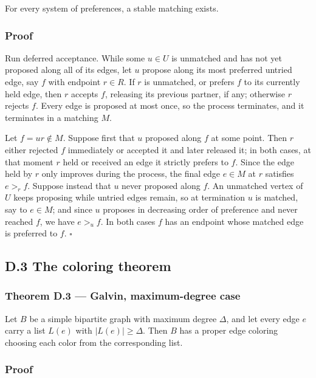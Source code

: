\documentclass[
  american,
  11pt,
  a4paper,
]{article}
\begin{document}
For every system of preferences, a stable matching exists.

\subsubsection{Proof}\label{proof-10}

Run deferred acceptance. While some \(u\in U\) is unmatched and has not yet proposed along all of its edges, let \(u\) propose along its most preferred untried edge, say \(f\) with endpoint \(r\in R\). If \(r\) is unmatched, or prefers \(f\) to its currently held edge, then \(r\) accepts \(f\), releasing its previous partner, if any; otherwise \(r\) rejects \(f\). Every edge is proposed at most once, so the process terminates, and it terminates in a matching \(M\).

Let \(f=ur\notin M\). Suppose first that \(u\) proposed along \(f\) at some point. Then \(r\) either rejected \(f\) immediately or accepted it and later released it; in both cases, at that moment \(r\) held or received an edge it strictly prefers to \(f\). Since the edge held by \(r\) only improves during the process, the final edge \(e\in M\) at \(r\) satisfies \(e>_rf\). Suppose instead that \(u\) never proposed along \(f\). An unmatched vertex of \(U\) keeps proposing while untried edges remain, so at termination \(u\) is matched, say to \(e\in M\); and since \(u\) proposes in decreasing order of preference and never reached \(f\), we have \(e>_uf\). In both cases \(f\) has an endpoint whose matched edge is preferred to \(f\). \(\square\)

\subsection{D.3 The coloring theorem}\label{d.3-the-coloring-theorem}

\subsubsection{Theorem D.3 --- Galvin, maximum-degree case}\label{theorem-d.3-galvin-maximum-degree-case}

Let \(B\) be a simple bipartite graph with maximum degree \(\Delta\), and let every edge \(e\) carry a list \(L(e)\) with \(|L(e)|\ge\Delta\). Then \(B\) has a proper edge coloring choosing each color from the corresponding list.

\subsubsection{Proof}\label{proof-11}
\end{document}
